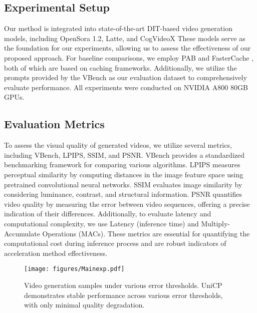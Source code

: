 \subsection{Experimental Setup}
Our method is integrated into state-of-the-art DIT-based video generation models, including OpenSora 1.2, Latte, and CogVideoX These models serve as the foundation for our experiments, allowing us to assess the effectiveness of our proposed approach. For baseline comparisons, we employ PAB \cite{zhao2024pab} and FasterCache \cite{lv2024fastercache}, both of which are based on caching frameworks. Additionally, we utilize the prompts provided by the VBench as our evaluation dataset to comprehensively evaluate performance. All experiments were conducted on NVIDIA A800 80GB GPUs.

\subsection{Evaluation Metrics} To assess the visual quality of generated videos, we utilize several metrics, including VBench\cite{huang2024vbench}, LPIPS\cite{zhang2018unreasonable}, SSIM\cite{wang2004image}, and PSNR\cite{korhonen2012peak}. VBench provides a standardized benchmarking framework for comparing various algorithms. LPIPS measures perceptual similarity by computing distances in the image feature space using pretrained convolutional neural networks. SSIM evaluates image similarity by considering luminance, contrast, and structural information. PSNR  quantifies video quality by measuring the error between video sequences, offering a precise indication of their differences. Additionally, to evaluate latency and computational complexity, we use Latency (inference time) and Multiply-Accumulate Operations (MACs). These metrics are essential for quantifying the computational cost during inference process and are robust indicators of acceleration method effectiveness.

\begin{figure}
    \centering
    \texttt{[image: figures/Mainexp.pdf]}
    \caption{Video generation samples under various error thresholds. UniCP demonstrates stable performance across various error thresholds, with only minimal quality degradation.}
    \label{fig:maxinexp}
    \vspace{-5mm}
\end{figure}
